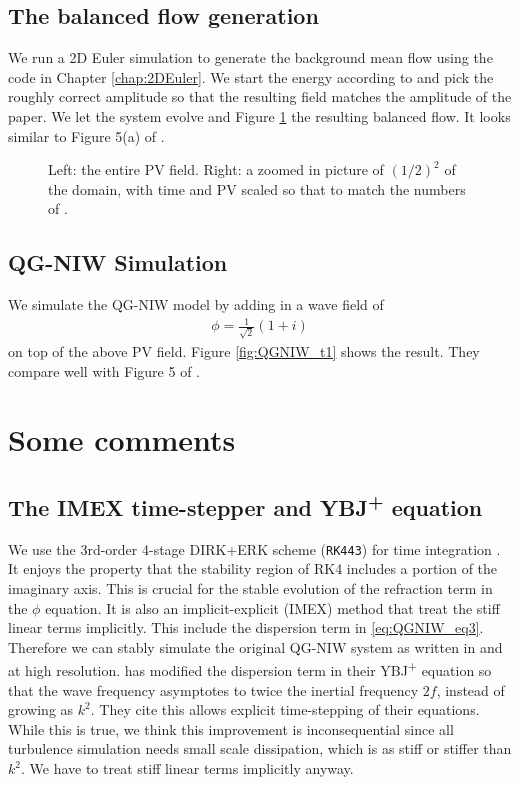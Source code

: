 \subsection{The balanced flow generation}
We run a 2D Euler simulation to generate the background mean flow using the code in Chapter \ref{chap:2DEuler}. We start the energy according to \cite[(4.2)]{RochaEtAl_18} and pick the roughly correct amplitude so that the resulting field matches the amplitude of the \cite{RochaEtAl_18} paper. We let the system evolve and Figure \ref{fig:PVbalanced} the resulting balanced flow. It looks similar to Figure 5(a) of \cite{RochaEtAl_18}. 
\begin{figure}[h]
    \centering
    \caption{Left: the entire PV field. Right: a zoomed in picture of $(1/2)^2$ of the domain, with time and PV scaled so that to match the numbers of \cite{RochaEtAl_18}.}
    \label{fig:PVbalanced}
\end{figure}

\subsection{QG-NIW Simulation}
We simulate the QG-NIW model by adding in a wave field of
\begin{align}
    \phi = \frac{1}{\sqrt{2}}(1+i)
\end{align}
on top of the above PV field. Figure \ref{fig:QGNIW_t1} shows the result. They compare well with Figure 5 of \cite{RochaEtAl_18}.
\begin{figure}[h]
    \centering
    \caption{}
    \label{fig:QGNIW_t}
\end{figure}

\section{Some comments}
\subsection{The IMEX time-stepper and YBJ\textsuperscript{+} equation}
We use the 3rd-order 4-stage DIRK+ERK scheme (\texttt{RK443}) for time integration \parencite[Sec 2.8]{AscherEtAl_97}. It enjoys the property that the stability region of RK4 includes a portion of the imaginary axis. This is crucial for the stable evolution of the refraction term in the $\phi$ equation. It is also an implicit-explicit (IMEX) method that treat the stiff linear terms implicitly. This include the dispersion term in \eqref{eq:QGNIW_eq3}. Therefore we can stably simulate the original QG-NIW system as written in \cite{XieVanneste_15} and \cite{RochaEtAl_18} at high resolution. \cite{AsselinYoung_19} has modified the dispersion term in their YBJ\textsuperscript{+} equation so that the wave frequency asymptotes to twice the inertial frequency $2f$, instead of growing as $k^2$. They cite this allows explicit time-stepping of their equations. While this is true, we think this improvement is inconsequential since all turbulence simulation needs small scale dissipation, which is as stiff or stiffer than $k^2$. We have to treat stiff linear terms implicitly anyway. 

